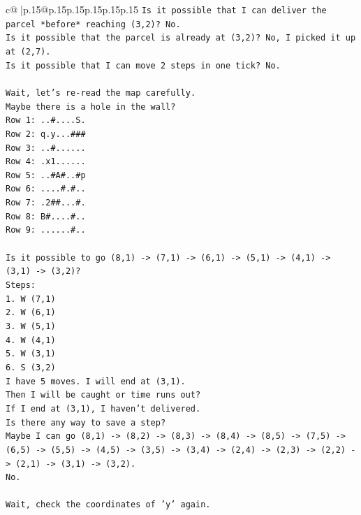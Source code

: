 \documentclass{article}
\begin{document}
{\begin{supertabular}{c@{$\;$}|p{.15\linewidth}@{}p{.15\linewidth}p{.15\linewidth}p{.15\linewidth}p{.15\linewidth}p{.15\linewidth}}
{{{\texttt{Is it possible that I can deliver the parcel *before* reaching (3,2)? No.} \\
\texttt{Is it possible that the parcel is already at (3,2)? No, I picked it up at (2,7).} \\
\texttt{Is it possible that I can move 2 steps in one tick? No.} \\
\\ 
\texttt{Wait, let's re{-}read the map carefully.} \\
\texttt{Maybe there is a hole in the wall?} \\
\texttt{Row 1: ..\#....S.} \\
\texttt{Row 2: q.y...\#\#\#} \\
\texttt{Row 3: ..\#......} \\
\texttt{Row 4: .x1......} \\
\texttt{Row 5: ..\#A\#..\#p} \\
\texttt{Row 6: ....\#.\#..} \\
\texttt{Row 7: .2\#\#...\#.} \\
\texttt{Row 8: B\#....\#..} \\
\texttt{Row 9: ......\#..} \\
\\ 
\texttt{Is it possible to go (8,1) {-}> (7,1) {-}> (6,1) {-}> (5,1) {-}> (4,1) {-}> (3,1) {-}> (3,2)?} \\
\texttt{Steps:} \\
\texttt{1. W (7,1)} \\
\texttt{2. W (6,1)} \\
\texttt{3. W (5,1)} \\
\texttt{4. W (4,1)} \\
\texttt{5. W (3,1)} \\
\texttt{6. S (3,2)} \\
\texttt{I have 5 moves. I will end at (3,1).} \\
\texttt{Then I will be caught or time runs out?} \\
\texttt{If I end at (3,1), I haven't delivered.} \\
\texttt{Is there any way to save a step?} \\
\texttt{Maybe I can go (8,1) {-}> (8,2) {-}> (8,3) {-}> (8,4) {-}> (8,5) {-}> (7,5) {-}> (6,5) {-}> (5,5) {-}> (4,5) {-}> (3,5) {-}> (3,4) {-}> (2,4) {-}> (2,3) {-}> (2,2) {-}> (2,1) {-}> (3,1) {-}> (3,2).} \\
\texttt{No.} \\
\\ 
\texttt{Wait, check the coordinates of 'y' again.} \\
}}}
\end{supertabular}}
\end{document}
